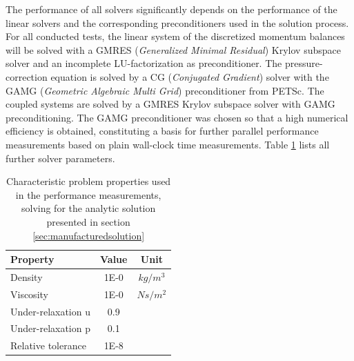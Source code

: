 The performance of all solvers significantly depends on the performance of the linear solvers and the corresponding preconditioners used in the solution process. For all conducted tests, the linear system of the discretized momentum balances will be solved with a GMRES (\emph{Generalized Minimal Residual}) \cite{saad86} Krylov subspace solver and an incomplete LU-factorization as preconditioner. The pressure-correction equation is solved by a CG (\emph{Conjugated Gradient}) solver \cite{hestenes52} with the GAMG (\emph{Geometric Algebraic Multi Grid}) preconditioner from PETSc. The coupled systems are solved by a GMRES Krylov subspace solver with GAMG preconditioning. The GAMG preconditioner was chosen so that a high numerical efficiency is obtained, constituting a basis for further parallel performance measurements based on plain wall-clock time measurements. Table \ref{tab:performance} lists all further solver parameters.

\begin{table}[h!]\centering
  \caption{Characteristic problem properties used in the performance measurements, solving for the analytic solution presented in section \ref{sec:manufacturedsolution}}
  \begin{tabular}{lcc}\toprule
    Property & Value & Unit \\
    \midrule
    \rowcolor{tud0a} Density    & 1E-0 & $kg/m^3$      \\
    \rowcolor{black!00} Viscosity  & 1E-0 & $Ns/m^2$  \\
    \rowcolor{tud0a} Under-relaxation u & 0.9 &  \\
    \rowcolor{black!00} Under-relaxation p & 0.1 &  \\
    \rowcolor{tud0a} Relative tolerance & 1E-8&
  \end{tabular}
  \label{tab:performance}
\end{table}
 
